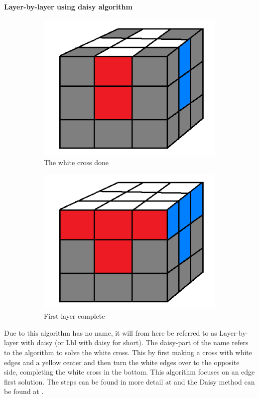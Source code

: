 \documentclass[a4paper,11pt]{kth-mag}
\begin{document}
\paragraph{Layer-by-layer using daisy algorithm}
\begin{figure}[b]
	\centering
	\begin{subfigure}[!b]{0.3\textwidth}
		\includegraphics[width=\textwidth]{figs/step1.png}
		\caption{The white cross done}
		\label{fig_4}
	\end{subfigure}
	\begin{subfigure}[!b]{0.3\textwidth}
		\includegraphics[width=\textwidth]{figs/step2.png}
		\caption{First layer complete}
		\label{fig_5}
	\end{subfigure}
	\caption{}
\end{figure}
Due to this algorithm has no name, it will from here be referred to as Layer-by-layer with daisy (or Lbl with daisy for short). The daisy-part of the name refers to the algorithm to solve the white cross. This by first making a cross with white edges and a yellow center and then turn the white edges over to the opposite side, completing the white cross in the bottom. This algorithm focuses on an edge first solution. The steps can be found in more detail at  \cite{Lee-Mao-Harris} and the Daisy method can be found at \cite{Shellie}. 
\end{document}
